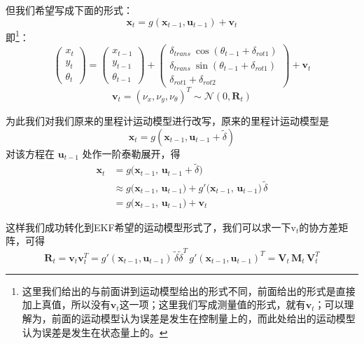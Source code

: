 \documentclass[../main.tex]{subfiles}
\begin{document}
\begin{enumerate}
{{\begin{enumerate}
    但我们希望写成下面的形式：
    $$
    \mathbf{x}_t = g(\mathbf{x}_{t-1},\mathbf{u}_{t-1}) + \mathbf{v}_t
    $$
    即\footnote{这里我们给出的与前面讲到运动模型给出的形式不同，前面给出的形式是直接加上真值，所以没有$\mathbf{v}_t$这一项；这里我们写成测量值的形式，就有$\mathbf{v}_t$；可以理解为，前面的运动模型认为误差是发生在控制量上的，而此处给出的运动模型认为误差是发生在状态量上的。}：
    $$
    \begin{pmatrix} x_t\\ y_t\\ \theta_t \end{pmatrix}
    =
    \begin{pmatrix} x_{t-1}\\ y_{t-1}\\ \theta_{t-1} \end{pmatrix}
    +
    \begin{pmatrix}
      \delta_{trans}\ \cos(\theta_{t-1} + \delta_{rot1})\\[4pt]
      \delta_{trans}\ \sin(\theta_{t-1} + \delta_{rot1})\\[4pt]
      \delta_{rot1} + \delta_{rot2}
    \end{pmatrix}
    + \mathbf{v}_t
    $$
    $$
    \mathbf{v}_t = (\nu_x,\nu_y,\nu_\theta)^T \sim \mathcal{N}(0,\mathbf{R}_t)
    $$
    
    为此我们对我们原来的里程计运动模型进行改写，原来的里程计运动模型是
    $$
    \mathbf{x}_t = g(\mathbf{x}_{t-1},\mathbf{u}_{t-1} + \tilde{\delta})
    $$
    对该方程在 $\mathbf{u}_{t-1}$ 处作一阶泰勒展开，得
    \begin{align*}
    \mathbf{x}_t &= g\big(\mathbf{x}_{t-1},\,\mathbf{u}_{t-1} + \tilde{\delta}\big) \\
    &\approx g\big(\mathbf{x}_{t-1},\,\mathbf{u}_{t-1}\big)
           + g'\big(\mathbf{x}_{t-1},\,\mathbf{u}_{t-1}\big)\,\tilde{\delta} \\
    &= g\big(\mathbf{x}_{t-1},\,\mathbf{u}_{t-1}\big) + \mathbf{v}_t
    \end{align*}
    
    这样我们成功转化到EKF希望的运动模型形式了，我们可以求一下$\mathrm{v}_t$的协方差矩阵，可得
    $$
    \mathbf{R}_t = \mathbf{v}_t \mathbf{v}_t^T = g'(\mathbf{x}_{t-1},\mathbf{u}_{t-1})\,\tilde{\delta}\tilde{\delta}^T\, g'(\mathbf{x}_{t-1},\mathbf{u}_{t-1})^T
    = \mathbf{V}_t\,\mathbf{M}_t\,\mathbf{V}_t^T
    $$
    

\end{enumerate}}}
\end{enumerate}
\end{document}
